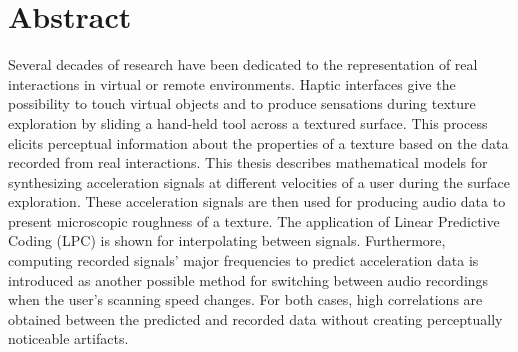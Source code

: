 
\thispagestyle{plain}

\section*{Abstract}


\switchlanguage{\lang} %
Several decades of research have been dedicated to the representation of real interactions in virtual or remote environments. Haptic interfaces give the possibility to touch virtual objects and to produce sensations during texture exploration by sliding a hand-held tool across a textured surface. This process elicits perceptual information about the properties of a texture based on the data recorded from real interactions. This thesis describes mathematical models for synthesizing acceleration signals at different velocities of a user during the surface exploration. These acceleration signals are then used for producing audio data to present microscopic roughness of a texture. The application of Linear Predictive Coding (LPC) is shown for interpolating between signals. Furthermore, computing recorded signals' major frequencies to predict acceleration data is introduced as another possible method for switching between audio recordings when the user's scanning speed changes. For both cases, high correlations are obtained between the predicted and recorded data without creating perceptually noticeable artifacts.






